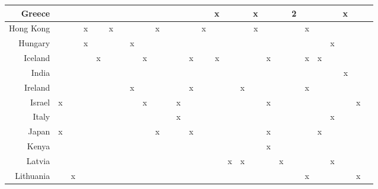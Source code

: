 {\begin{longtable}{|r|r|r|r|r|r|r|r|r|r|r|r|r|r|r|r|r|r|r|r|r|r|r|r|r|r|r|}
Greece &     &     &     &     &     &     &     &     &     &     &     &     &     &    x &     &     &    x &     &     &   2 &     &     &     &    x &     &     \\ \midrule
Hong Kong &     &     &    x &     &    x &     &     &     &    x &     &     &     &    x &     &     &     &    x &     &     &     &    x &     &     &     &     &     \\ \midrule
Hungary &     &     &    x &     &     &     &    x &     &     &     &     &     &     &     &     &     &     &     &     &     &     &     &    x &     &     &     \\ \midrule
Iceland &     &     &     &    x &     &     &     &    x &     &     &     &    x &     &    x &     &     &     &    x &     &     &    x &    x &     &     &     &     \\ \midrule
India &     &     &     &     &     &     &     &     &     &     &     &     &     &     &     &     &     &     &     &     &     &     &     &    x &     &     \\ \midrule
Ireland &     &     &     &     &     &     &    x &     &     &     &     &    x &     &     &     &    x &     &     &     &     &    x &     &     &     &     &     \\ \midrule
Israel &    x &     &     &     &     &     &     &    x &     &     &    x &     &     &     &     &     &     &    x &     &     &     &     &     &     &    x &     \\ \midrule
Italy &     &     &     &     &     &     &     &     &     &     &    x &     &     &     &     &     &     &     &     &     &     &     &    x &     &     &     \\ \midrule
Japan &    x &     &     &     &     &     &     &     &    x &     &     &    x &     &     &     &     &     &    x &     &     &     &    x &     &     &     &     \\ \midrule
Kenya &     &     &     &     &     &     &     &     &     &     &     &     &     &     &     &     &     &    x &     &     &     &     &     &     &     &     \\ \midrule
Latvia &     &     &     &     &     &     &     &     &     &     &     &     &     &     &    x &    x &     &     &    x &     &     &     &    x &     &     &     \\ \midrule
Lithuania &     &    x &     &     &     &     &     &     &     &     &     &     &     &     &     &     &     &     &     &     &    x &     &     &     &    x &     \\ \midrule

\end{longtable}}
